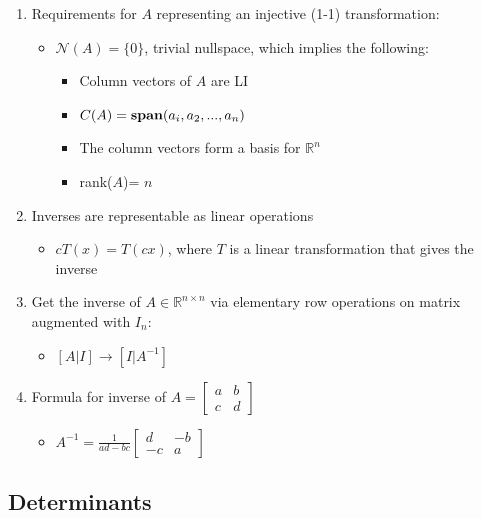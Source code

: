 \documentclass[10pt,letterpaper]{article}
\begin{document}
\begin{enumerate}
\item Requirements for $A$ representing an injective (1-1) transformation:

\begin{itemize}
\item $\mathcal{N}(A) = \{0\}$, trivial nullspace, which implies the following:

\begin{itemize}
\item Column vectors of $A$ are LI
\item $C(A)= {\bf span} (a_i, a_2, ..., a_n)$
\item The column vectors form a basis for $\mathbb{R}^{n}$
\item rank($A$)= $n$
\end{itemize}

\end{itemize}

\setcounter{enumi}{74}
\item  Inverses are representable as linear operations

\begin{itemize}
\item $cT(x) = T(cx)$, where $T$ is a linear transformation that gives the inverse
\end{itemize}

\item Get the inverse of $A \in \mathbb{R}^{n \times n}$ via elementary row operations on matrix augmented with $I_n$:

\begin{itemize}
\item $[A|I]\rightarrow [I|A^{-1}]$
\end{itemize}

\setcounter{enumi}{77}
\item  Formula for inverse of $A=\begin{bmatrix} a & b \\ c & d \end{bmatrix}$

\begin{itemize}
\item $A ^{-1} = \frac{1}{ad-bc} \begin{bmatrix} d & -b \\ -c & a \end{bmatrix}$
\end{itemize}

\end{enumerate}
\subsection{Determinants}
\label{sec-1_6}
\end{document}
